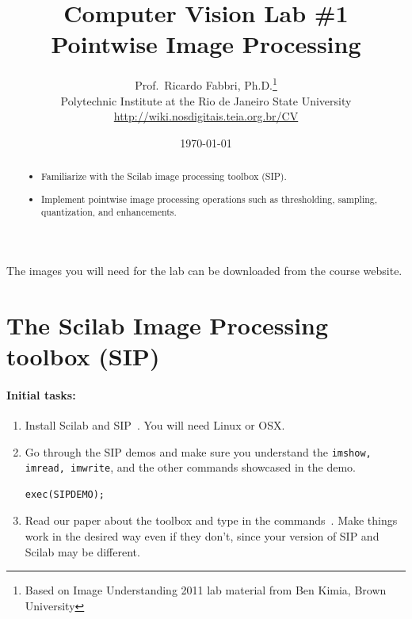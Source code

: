 \documentclass[a4paper]{article}
\begin{document}
\title{\textsf{Computer Vision Lab \#1\\ Pointwise Image Processing}
} 

\author{Prof.\ Ricardo Fabbri, Ph.D.\footnote{Based on Image Understanding
2011 lab material from Ben Kimia, Brown University}\\[1em]
Polytechnic Institute at the Rio de Janeiro State University\\
\url{http://wiki.nosdigitais.teia.org.br/CV}
}
 

\date{\today}
\maketitle
\begin{abstract}
\noindent\begin{itemize}
\item Familiarize with the Scilab image
processing toolbox (SIP).
\item Implement pointwise image processing operations such as thresholding,
sampling, quantization, and enhancements.
\end{itemize}
\end{abstract}
\vspace{2em}



The images you will need for the lab can be downloaded from the course
website.

\section{The Scilab Image Processing toolbox (SIP)}

\paragraph{Initial tasks:}
\begin{enumerate}
\item Install Scilab and SIP~\cite{scilab,Fabbri:etal:Arxiv2012}. You will need Linux or OSX.
\item Go through the SIP demos and make sure you understand the \texttt{imshow, imread,
imwrite}, and the other commands showcased in the demo.
\begin{lstlisting}[numbers=none]
exec(SIPDEMO);
\end{lstlisting}
\item Read our paper about the toolbox and type in the commands~\cite{Fabbri:etal:Arxiv2012}.
Make things work in the desired way even if they don't, since your version of
SIP and Scilab may be different.
\end{enumerate}
\end{document}

